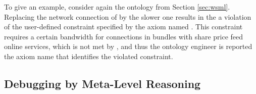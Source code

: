 To give an example, consider again the ontology from Section
\ref{sec:wsml}. Replacing the network connection  of
 by the slower  one results in the a
violation of the user-defined constraint specified by the axiom
named . This constraint
requires a certain bandwidth for connections in bundles with share
price feed online services, which is not met by ,
and thus the ontology engineer is reported the axiom name that
identifies the violated constraint.


\subsection{Debugging by Meta-Level Reasoning}
